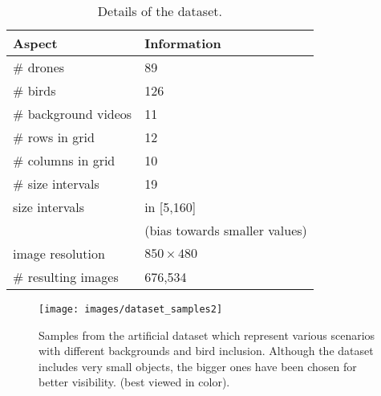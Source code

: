 \documentclass[10pt,twocolumn,letterpaper]{article}
\begin{document}
\begin{algorithm}[!h]
\end{algorithm}\begin{table}[hbt!]
	\begin{center}
		\caption{Details of the dataset.
        \label{datasettable}}
		\vspace{-0.2cm}
		\begin{tabularx}{\columnwidth}{l l}
        	\hline
			\textbf{Aspect}  &  \textbf{Information}\\
			\hline \hline
			\# drones                            & 89\\
			\# birds                             & 126\\
			\# background videos                 & 11\\
			\# rows in grid                      & 12\\
			\# columns in grid                   & 10\\
			\# size intervals                    & 19\\
			size intervals                       & in [5,160] \\
            									 &(bias towards smaller values) \\
            image resolution                     & $850 \times 480$\\ 
			\hline
			\# resulting images                  & 676,534\\
            \hline
		\end{tabularx}
	\end{center}
\end{table}\begin{figure}
	\centering
		\texttt{[image: images/dataset\_samples2]}
    	\caption{Samples from the artificial dataset which represent various scenarios with different backgrounds and bird inclusion. Although the dataset includes very small objects, the bigger ones have been chosen for better visibility. (best viewed in color).}
        \label{samples}
\end{figure}\par%
\end{document}

